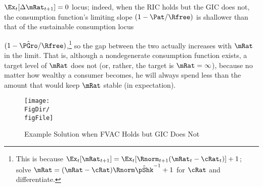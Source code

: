 \documentclass[titlepage]{\econtex}\providecommand{\texname}{BufferStockTheory}%
\providecommand{\FigDir}{Figures}
\begin{document}
$\Ex_{t}[\Delta \mRat_{t+1}]=0$ locus; indeed, when the RIC holds but
the GIC does not, the consumption function's limiting slope
$(1-\Pat/\Rfree)$ is shallower than that of the sustainable consumption
locus {$(1-\PGroAdj/\Rfree)$,\footnote{This is because
    $\Ex_{t}[\mRat_{t+1}]=\Ex_{t}[\Rnorm_{t+1}(\mRat_{t}-\cRat_{t})]+1$; solve $\mRat = (\mRat - \cRat)\Rnorm \InvEpShkInv^{-1}+1$ for $\cRat$ and differentiate.}
  so the gap between the two actually increases with $\mRat$ in the
  limit.  That is, although a nondegenerate consumption function
  exists, a target level of $\mRat$ does not (or, rather, the
  target is $\mRat=\infty$), because no matter how wealthy a consumer
  becomes, he will always spend less than the amount that
  would keep $\mRat$ stable (in expectation).

\renewcommand{\figFile}{FVACnotGIC}
\hypertarget{\figFile}{}  
\begin{figure}[tbp]
\centerline{\texttt{[image: \\FigDir/\\figFile]}}
\caption{Example Solution when FVAC Holds but GIC Does Not}
\label{fig:\figFile}
\end{figure}

\begin{comment}
The foregoing has some connection with the theoretical results in
Szeidl~\citeyearpar{szeidlInvariant}, who shows that the condition we
call the GIC guarantees that $\mRat$ will have an asymptotically
bounded mean.  He also shows that under these circumstances $\mRat$
satisfies conditions he proves to be necessary for the existence of a
stable invariant distribution.  Furthermore, $\aRat$, $\bRat$, and $\cRat$
are also shown to have stable invariant distributions and asymptotically
bounded means.  We make use of these results below.
\end{comment}

\begin{comment} %
A final point worth reemphasizing is that neither the Return
Impatience Condition nor the Finite Human Wealth Condition was
required for the contraction mapping proof.  Both these conditions are
necessary for a nondegenerate solution to exist in the unconstrained
perfect foresight case.  This is noteworthy because in some models and
in many economists' intuition, the introduction of uncertainty reduces
the space of parameter values for which a unique solution exists;
here, precisely the opposite occurs.  Indeed, many of the
parameterizations newly eligible for solution are quite plausible, so
this observation is not merely a curiosum but of real practical
value.\footnote{An easy example of a case where the perfect foresight
  model has no solution is where $\Rfree >1$, $\DiscFac = 1/\Rfree$
  and $\PGro > \Rfree$.}
\end{comment}

}
\end{document}
